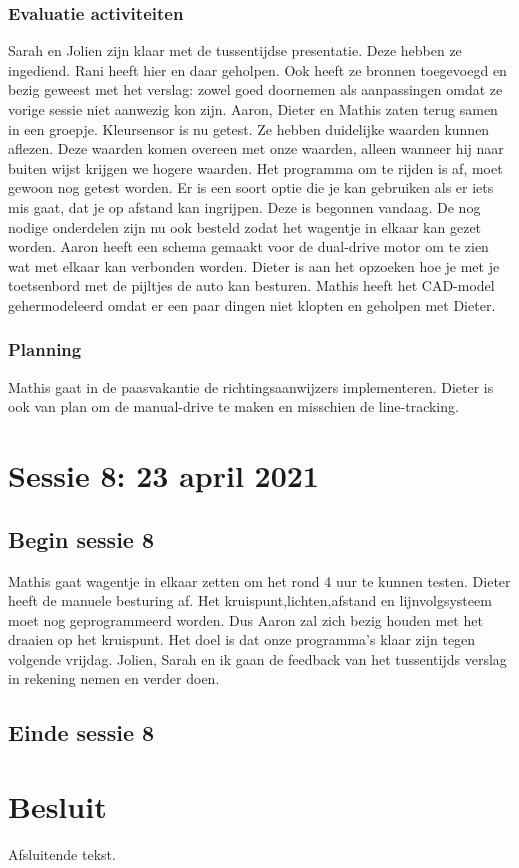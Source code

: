 \documentclass[a4paper,twoside,kulak]{kulakreport} %
\begin{document}
\subsection{Evaluatie activiteiten}
Sarah en Jolien zijn klaar met de tussentijdse presentatie. Deze hebben ze ingediend. Rani heeft hier en daar geholpen. Ook heeft ze bronnen toegevoegd en bezig geweest met het verslag: zowel goed doornemen als aanpassingen omdat ze vorige sessie niet aanwezig kon zijn. Aaron, Dieter en Mathis zaten terug samen in een groepje. Kleursensor is nu getest. Ze hebben duidelijke waarden kunnen aflezen. Deze waarden komen overeen met onze waarden, alleen wanneer hij naar buiten wijst krijgen we hogere waarden. Het programma om te rijden is af, moet gewoon nog getest worden. Er is een soort optie die je kan gebruiken als er iets mis gaat, dat je op afstand kan ingrijpen. Deze is begonnen vandaag. De nog nodige onderdelen zijn nu ook besteld zodat het wagentje in elkaar kan gezet worden. Aaron heeft een schema gemaakt voor de dual-drive motor om te zien wat met elkaar kan verbonden worden. Dieter is aan het opzoeken hoe je met je toetsenbord met de pijltjes de auto kan besturen. Mathis heeft het CAD-model gehermodeleerd omdat er een paar dingen niet klopten en geholpen met Dieter. 

\subsection{Planning}
Mathis gaat in de paasvakantie de richtingsaanwijzers implementeren. Dieter is ook van plan om de manual-drive te maken en misschien de line-tracking. 

\chapter{Sessie 8: 23 april 2021}
\section{Begin sessie 8}
Mathis gaat wagentje in elkaar zetten om het rond 4 uur te kunnen testen. Dieter heeft de manuele besturing af. Het kruispunt,lichten,afstand en lijnvolgsysteem moet nog geprogrammeerd worden. Dus Aaron zal zich bezig houden met het draaien op het kruispunt. Het doel is dat onze programma's klaar zijn tegen volgende vrijdag. Jolien, Sarah en ik gaan de feedback van het tussentijds verslag in rekening nemen en verder doen.
\section{Einde sessie 8}









\chapter*{Besluit}
Afsluitende tekst.
\end{document}
